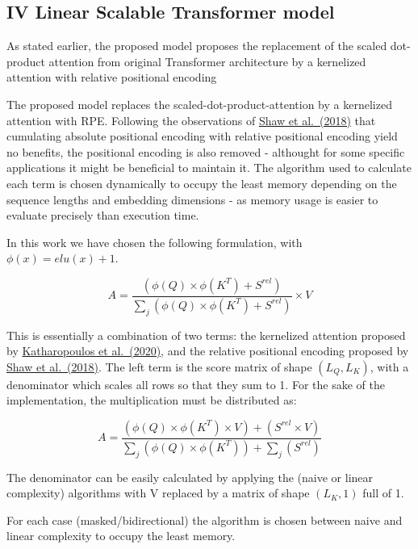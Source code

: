 \hypertarget{iv-linear-scalable-transformer-model}{%
\subsection{IV Linear Scalable Transformer
model}\label{iv-linear-scalable-transformer-model}}

As stated earlier, the proposed model proposes the replacement of the
scaled dot-product attention from original Transformer architecture by a
kernelized attention with relative positional encoding

The proposed model replaces the scaled-dot-product-attention by a
kernelized attention with RPE. Following the observations of
\href{https://arxiv.org/abs/1803.02155}{Shaw et al.~(2018)} that
cumulating absolute positional encoding with relative positional
encoding yield no benefits, the positional encoding is also removed -
althought for some specific applications it might be beneficial to
maintain it. The algorithm used to calculate each term is chosen
dynamically to occupy the least memory depending on the sequence lengths
and embedding dimensions - as memory usage is easier to evaluate
precisely than execution time.

In this work we have chosen the following formulation, with
\(\phi(x) = elu(x) + 1\).

\[A = \frac{\left( \phi(Q) \times \phi(K^T) + S^{rel} \right)}{\sum_j \left( \phi(Q) \times \phi(K^T) + S^{rel} \right)} \times V\]

This is essentially a combination of two terms: the kernelized attention
proposed by \href{https://arxiv.org/abs/2006.16236}{Katharopoulos et
al.~(2020)}, and the relative positional encoding proposed by
\href{https://arxiv.org/abs/1803.02155}{Shaw et al.~(2018)}. The left
term is the score matrix of shape \((L_Q, L_K)\), with a denominator
which scales all rows so that they sum to 1. For the sake of the
implementation, the multiplication must be distributed as:

\[A = \frac{\left( \phi(Q) \times \phi(K^T) \times V \right) + \left( S^{rel} \times V\right)}{\sum_j \left( \phi(Q) \times \phi(K^T) \right) + \sum_j \left( S^{rel} \right)}\]

The denominator can be easily calculated by applying the (naive or
linear complexity) algorithms with V replaced by a matrix of shape
\((L_K, 1)\) full of 1.

For each case (masked/bidirectional) the algorithm is chosen between
naive and linear complexity to occupy the least memory.


